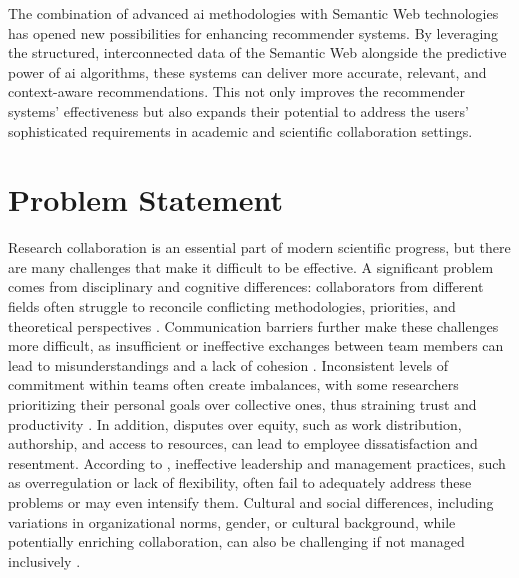 The combination of advanced \gls{ai} methodologies with Semantic Web technologies has opened new possibilities for enhancing recommender systems.
By leveraging the structured, interconnected data of the Semantic Web alongside the predictive power of \gls{ai} algorithms, these systems can deliver more accurate, relevant, and context-aware recommendations.
This not only improves the recommender systems' effectiveness but also expands their potential to address the users' sophisticated requirements in academic and scientific collaboration settings.
%
\section{Problem Statement}\label{sec:problem-statement}
Research collaboration is an essential part of modern scientific progress, but there are many challenges that make it difficult to be effective.
A significant problem comes from disciplinary and cognitive differences: collaborators from different fields often struggle to reconcile conflicting methodologies, priorities, and theoretical perspectives \cite{Bozeman2014}.
Communication barriers further make these challenges more difficult, as insufficient or ineffective exchanges between team members can lead to misunderstandings and a lack of cohesion \cite{Melin1996,Mwantimwa2023}.
Inconsistent levels of commitment within teams often create imbalances, with some researchers prioritizing their personal goals over collective ones, thus straining trust and productivity \cite{Melin1996}.
In addition, disputes over equity, such as work distribution, authorship, and access to resources, can lead to employee dissatisfaction and resentment.
According to \cite{KSubramanyam1983}, ineffective leadership and management practices, such as overregulation or lack of flexibility, often fail to adequately address these problems or may even intensify them.
Cultural and social differences, including variations in organizational norms, gender, or cultural background, while potentially enriching collaboration, can also be challenging if not managed inclusively \cite{ABRAMO20171016}.

